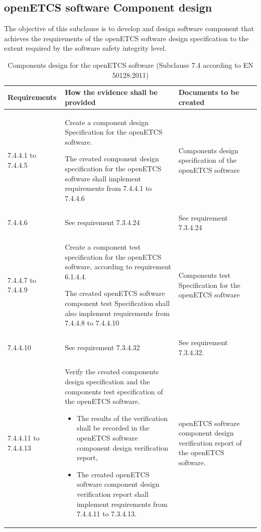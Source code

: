 \documentclass{template/openetcs_report}
\begin{document}
\subsection{openETCS software Component design}
\begin{flushleft}
The objective of this subclause is to develop and design software component that achieves the requirements of the openETCS software design specification to the extent required by the software safety integrity level.
\end{flushleft}
{\footnotesize\sffamily\centering
\begin{longtable}{|p{2cm}|p{9cm}|p{3cm}|}
\caption{Components design for the openETCS software (Subclause 7.4 according to EN 50128:2011)}\\
\hline
\bfseries Requirements & \bfseries How the evidence shall be provided & \bfseries Documents to be created\\
\hline
\hline
\endhead
\hline
\endfoot

7.4.4.1 to 7.4.4.5 & Create a component design Specification for the openETCS software.
 
The created component design specification for the openETCS software shall implement requirements from 7.4.4.1 to 7.4.4.6
& Components design specification of the openETCS software\\ 
\hline
7.4.4.6 & See requirement 7.3.4.24 & See requirement 7.3.4.24\\ 
\hline
7.4.4.7 to 7.4.4.9 & Create a component test specification for the openETCS software, according to requirement 6.1.4.4.

The created openETCS software component test Specification shall also implement requirements from 7.4.4.8 to 7.4.4.10
& Components test Specification for the openETCS software\\ 
\hline
7.4.4.10 & See requirement 7.3.4.32 & See requirement 7.3.4.32.\\ 
\hline
7.4.4.11 to 7.4.4.13 & Verify the created components design specification and the components test specification of the openETCS software.
\begin{itemize}\itemsep=0pt
  \item The results of the verification shall be recorded in the openETCS software component design verification report,
  \item The created openETCS software component design verification report shall implement requirements from 7.4.4.11 to 7.3.4.13. 
\end{itemize}
& openETCS software component design verification report of the openETCS software.\\ 
\hline
\end{longtable}}
\end{document}
